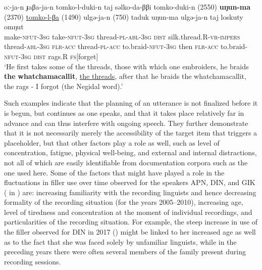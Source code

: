 \documentclass[output=paper]{langscibook}
\begin{document}
\ea \label{ex:pakendorf:50}
\gll oː-ja-n ɟaβa-ja-n tomko-l-duki-n taj səlko-da-ββi tomko-duki-n
	\textup{(2550)} \textbf{uŋun-ma} \textup{(2370)}
	\uline{tomko-l-βa}
	\textup{(1490)} ulgə-ja-n \textup{(750)}
	taduk uŋun-ma ulgə-ja-n taj loskuty omŋut\\
     make-\textsc{nfut-3sg} take-\textsc{nfut-3sg} thread-\textsc{pl-abl-3sg} \textsc{dist} silk.thread.R-\textsc{vr-impers} thread-\textsc{abl-3sg}
     {} \textsc{flr-acc} {}
     thread-\textsc{pl-acc}
     {} to.braid-\textsc{nfut-3sg} {} then \textsc{flr-acc} to.braid-\textsc{nfut-3sg} \textsc{dist} rags.R \textsc{fs[}forget]\\
\glt ‘He first takes some of the threads, those with which one embroiders, he braids \textbf{the} \textbf{whatchamacallit}, \uline{the threads}, after that he braids the whatchamacallit, the rags - I forgot (the Negidal word).’ 
\z


Such examples indicate that the planning of an utterance is not finalized before it is begun, but continues as one speaks, and that it takes place relatively far in advance and can thus interfere with ongoing speech. They further demonstrate that it is not necessarily merely the accessibility of the target item that triggers a placeholder, but that other factors play a role as well, such as level of concentration, fatigue, physical well-being, and external and internal distractions, not all of which are easily identifiable from documentation corpora such as the one used here. Some of the factors that might have played a role in the fluctuations in filler use over time observed for the speakers APN, DIN, and GIK ( in ) are: increasing familiarity with the recording linguists and hence decreasing formality of the recording situation (for the years 2005--2010), increasing age, level of tiredness and concentration at the moment of individual recordings, and particularities of the recording situation. For example, the steep increase in use of the filler observed for DIN in 2017 () might be linked to her increased age as well as to the fact that she was faced solely by unfamiliar linguists, while in the preceding years there were often several members of the family present during recording sessions.
\end{document}
